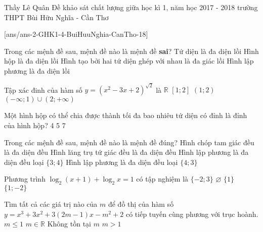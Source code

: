 
\begin{name}
{Thầy Lê Quân}
{Đề khảo sát chất lượng giữa học kì 1, năm học 2017 - 2018 trường THPT Bùi Hữu Nghĩa - Cần Thơ}
\end{name}
\setcounter{ex}{0}
[ans/ans-2-GHK1-4-BuiHuuNghia-CanTho-18]
\begin{ex}%
Trong các mệnh đề sau, mệnh đề nào là mệnh đề {\bf sai}?
\choice
{Tứ diện là đa diện lồi}
{Hình hộp là đa diện lồi}
{\True Hình tạo bởi hai tứ diện ghép với nhau là đa giác lồi}
{Hình lập phương là đa diện lồi}
\end{ex}

\begin{ex}%
Tập xác đinh của hàm số $y=\left(x^2-3x+2\right)^{\sqrt{2}}$ là
\choice
{$\mathbb{R}$}
{$[1; 2]$}
{$(1; 2)$}
{\True $(-\infty; 1)\cup (2; +\infty)$}
\end{ex}

\begin{ex}%
Một hình hộp có thể chia được thành tối đa bao nhiêu tứ diện có đỉnh là đỉnh của hình hộp?
\choice
{4}
{5}
{}
{7}
\end{ex}

\begin{ex}%
Trong các mệnh đề sau, mệnh đề nào là mệnh đề đúng?
\choice
{Hình chóp tam giác đều là  đa diện đều}
{Hình lăng trụ tứ giác đều là đa diện đều}
{Hình lập phương là đa diện đều loại $\{3; 4\}$}
{\True Hình lập phương là đa diện đều loại $\{4; 3\}$}
\end{ex}

\begin{ex}%
Phương trình $\log_2 (x+1)+\log_2 x=1$ có tập nghiệm là
\choice
{$\{-2; 3\}$}
{$\varnothing$}
{\True $\{1\}$}
{$\{1; -2\}$}
\end{ex}

\begin{ex}%
Tìm tất cả các giá trị nào của $m$ để đồ thị của hàm số $y=x^3+3x^2+3(2m-1)x-m^2+2$ có tiếp tuyến cùng phương  với trục hoành.
\choice
{\True $m\le 1$}
{$m\in \mathbb{R}$}
{Không tồn tại $m$}
{$m>1$}
\end{ex}

